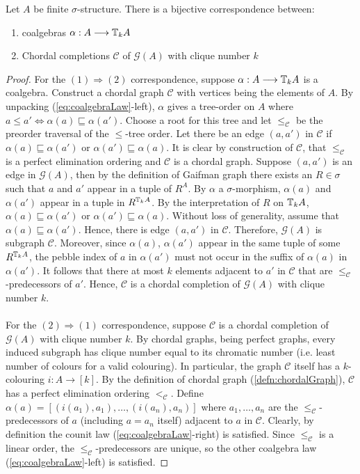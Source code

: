 \begin{prop}
Let $A$ be finite $\sigma$-structure. There is a bijective correspondence between:
\begin{enumerate}[label=(\arabic*)]
\item coalgebras $\alpha:A \longrightarrow {\mathbb{T}_{k}A}$
\item Chordal completions $\mathcal{C}$ of $\mathcal{G}(A)$ with clique number $k$
\end{enumerate}
\begin{proof}
For the $(1) \Rightarrow (2)$ correspondence, suppose $\alpha:A \longrightarrow {\mathbb{T}_{k}A}$ is a coalgebra. Construct a chordal graph $\mathcal{C}$ with vertices being the elements of $A$. By unpacking (\ref{eq:coalgebraLaw}-left), $\alpha$ gives a tree-order on $A$ where $a \leq a' \Leftrightarrow \alpha(a) \sqsubseteq \alpha(a')$. Choose a root for this tree and let $\leq_{\mathcal{C}}$ be the preorder traversal of the $\leq$-tree order. Let there be an edge $(a,a')$ in $\mathcal{C}$ if $\alpha(a) \sqsubseteq \alpha(a')$ or $\alpha(a') \sqsubseteq \alpha(a)$.   
It is clear by construction of $\mathcal{C}$, that $\leq_{\mathcal{C}}$ is a perfect elimination ordering and $\mathcal{C}$ is a chordal graph. Suppose $(a,a')$ is an edge in $\mathcal{G}(A)$, then by the definition of Gaifman graph there exists an $R \in \sigma$ such that $a$ and $a'$ appear in a tuple of $R^{A}$. By $\alpha$ a $\sigma$-morphism, $\alpha(a)$ and $\alpha(a')$ appear in a tuple in $R^{{\mathbb{T}_{k}A}}$. By the interpretation of $R$ on ${\mathbb{T}_{k}A}$, $\alpha(a) \sqsubseteq \alpha(a')$ or $\alpha(a') \sqsubseteq \alpha(a)$. Without loss of generality, assume that $\alpha(a) \sqsubseteq \alpha(a')$. Hence, there is edge $(a,a')$ in $\mathcal{C}$. Therefore, $\mathcal{G}(A)$ is subgraph $\mathcal{C}$. Moreover, since $\alpha(a)$, $\alpha(a')$ appear in the same tuple of some $R^{{\mathbb{T}_{k}A}}$, the pebble index of $a$ in $\alpha(a')$ must not occur in the suffix of $\alpha(a)$ in $\alpha(a')$. It follows that there at most $k$ elements adjacent to $a'$ in $\mathcal{C}$ that are $\leq_{\mathcal{C}}$-predecessors of $a'$. Hence, $\mathcal{C}$ is a chordal completion of $\mathcal{G}(A)$ with clique number $k$. \\~\\
For the $(2) \Rightarrow (1)$ correspondence, suppose $\mathcal{C}$ is a chordal completion of $\mathcal{G}(A)$ with clique number $k$. By chordal graphs, being perfect graphs, every induced subgraph has clique number equal to its chromatic number (i.e. least number of colours for a valid colouring). In particular, the graph $\mathcal{C}$ itself has a $k$-colouring $i:A \longrightarrow [k]$. By the definition of chordal graph (\ref{defn:chordalGraph}), $\mathcal{C}$ has a perfect elimination ordering $<_{\mathcal{C}}$. Define $\alpha(a) = [(i(a_{1}),a_{1}),\dots,(i(a_{n}),a_{n})]$ where $a_{1},\dots,a_{n}$ are the $\leq_{\mathcal{C}}$-predecessors of $a$ (including $a = a_{n}$ itself) adjacent to $a$ in $\mathcal{C}$. Clearly, by definition the counit law (\ref{eq:coalgebraLaw}-right) is satisfied. Since $\leq_{\mathcal{C}}$ is a linear order, the $\leq_{\mathcal{C}}$-predecessors are unique, so the other coalgebra law (\ref{eq:coalgebraLaw}-left) is satisfied.       

\end{proof}
\end{prop}
